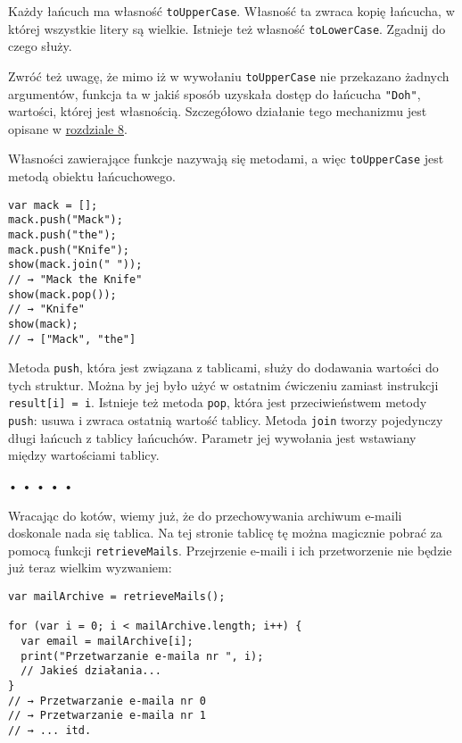 Każdy łańcuch ma własność \texttt{toUpperCase}. Własność ta zwraca kopię łańcucha, w której wszystkie litery są wielkie. Istnieje też własność \texttt{toLowerCase}. Zgadnij do czego służy.

    
Zwróć też uwagę, że mimo iż w wywołaniu \texttt{toUpperCase} nie przekazano żadnych argumentów, funkcja ta w jakiś sposób uzyskała dostęp do łańcucha \texttt{"Doh"}, wartości, której jest własnością. Szczegółowo działanie tego mechanizmu jest opisane w \hyperref[chap:8]{rozdziale 8}.

    
Własności zawierające funkcje nazywają się metodami, a więc \texttt{toUpperCase} jest metodą obiektu łańcuchowego.

    
\begin{verbatim} 
var mack = [];
mack.push("Mack");
mack.push("the");
mack.push("Knife");
show(mack.join(" "));
// → "Mack the Knife"
show(mack.pop());
// → "Knife"
show(mack);
// → ["Mack", "the"]
\end{verbatim}
    
Metoda \texttt{push}, która jest związana z tablicami, służy do dodawania wartości do tych struktur. Można by jej było użyć w ostatnim ćwiczeniu zamiast  instrukcji \texttt{result[i] = i}. Istnieje też metoda \texttt{pop}, która jest przeciwieństwem metody \texttt{push}: usuwa i zwraca ostatnią wartość tablicy. Metoda \texttt{join} tworzy pojedynczy długi łańcuch z tablicy łańcuchów. Parametr jej wywołania jest wstawiany między wartościami tablicy.

  
  
\begin{center}
• • • • •
\end{center}
  
    
Wracając do kotów, wiemy już, że do przechowywania archiwum e-maili doskonale nada się tablica. Na tej stronie tablicę tę można magicznie pobrać za pomocą funkcji \texttt{retrieveMails}. Przejrzenie e-maili i ich przetworzenie nie będzie już teraz wielkim wyzwaniem:

    
\begin{verbatim} 
var mailArchive = retrieveMails();

for (var i = 0; i < mailArchive.length; i++) {
  var email = mailArchive[i];
  print("Przetwarzanie e-maila nr ", i);
  // Jakieś działania...
}
// → Przetwarzanie e-maila nr 0
// → Przetwarzanie e-maila nr 1
// → ... itd.
\end{verbatim}
    
